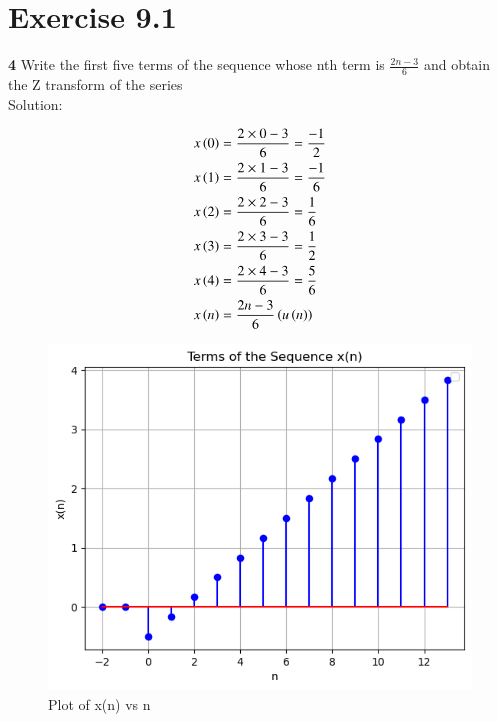 \documentclass[journal,12pt,twocolumn]{IEEEtran}
\begin{document}


\vspace{3cm}

\title{}
\author{EE23BTECH11047 - Deepakreddy P
}
\maketitle
\newpage
\bigskip

\section*{Exercise 9.1}

\noindent \textbf{4} \hspace{2pt} Write the first five terms of the sequence whose nth term is $\frac{2n-3}{6}$ and obtain the Z transform of the series\\
\noindent Solution:

\begin{align}
x \left(0\right) &= \frac{2 \times 0 - 3}{6} = \frac{-1}{2}\\
x \left(1\right) &= \frac{2 \times 1 - 3}{6} = \frac{-1}{6} \\
x \left(2\right) &= \frac{2 \times 2 - 3}{6} = \frac{1}{6}\\
x \left(3\right) &= \frac{2 \times 3 - 3}{6} = \frac{1}{2} \\
x \left(4\right) &= \frac{2 \times 4 - 3}{6} = \frac{5}{6}\\
x \left(n\right) &= \frac{2n-3}{6} \left(u\left(n\right)\right)
\label{x(n)}
\end{align}

\begin{figure}[h]
   \centering
   \includegraphics[width=1\columnwidth]{figs/plot.png}
   \caption{Plot of x(n) vs n}
   \label{fig: 9.1.4.1}
\end{figure}
\end{document}
